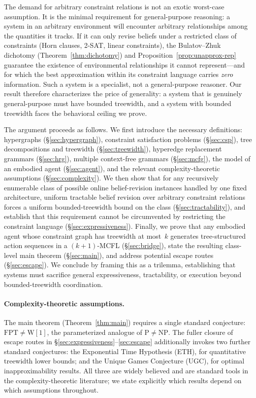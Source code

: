 \documentclass[11pt,a4paper]{article}
\theoremstyle{plain}
\theoremstyle{definition}
\theoremstyle{remark}
\begin{document}
The demand for arbitrary constraint relations is not an exotic worst-case assumption.
It is the minimal requirement for general-purpose reasoning: a system in an arbitrary environment will encounter arbitrary relationships among the quantities it tracks.
If it can only revise beliefs under a restricted class of constraints (Horn clauses, 2-SAT, linear constraints), the Bulatov--Zhuk dichotomy (Theorem~\ref{thm:dichotomy}) and Proposition~\ref{prop:unapprox-rep} guarantee the existence of environmental relationships it cannot represent---and for which the best approximation within its constraint language carries \emph{zero} information.
Such a system is a specialist, not a general-purpose reasoner.
Our result therefore characterizes the price of generality: a system that is genuinely general-purpose must have bounded treewidth, and a system with bounded treewidth faces the behavioral ceiling we prove.

The argument proceeds as follows.
We first introduce the necessary definitions: hypergraphs (\S\ref{sec:hypergraph}), constraint satisfaction problems (\S\ref{sec:csp}), tree decompositions and treewidth (\S\ref{sec:treewidth}), hyperedge replacement grammars (\S\ref{sec:hrg}), multiple context-free grammars (\S\ref{sec:mcfg}), the model of an embodied agent (\S\ref{sec:agent}), and the relevant complexity-theoretic assumptions (\S\ref{sec:complexity}).
We then show that for any recursively enumerable class of possible online belief-revision instances handled by one fixed architecture, uniform tractable belief revision over arbitrary constraint relations forces a uniform bounded-treewidth bound on the class (\S\ref{sec:tractability}), and establish that this requirement cannot be circumvented by restricting the constraint language (\S\ref{sec:expressiveness}).
Finally, we prove that any embodied agent whose constraint graph has treewidth at most~$k$ generates tree-structured action sequences in a $(k{+}1)$-MCFL (\S\ref{sec:bridge}), state the resulting class-level main theorem (\S\ref{sec:main}), and address potential escape routes (\S\ref{sec:escape}). We conclude by framing this as a trilemma, establishing that systems must sacrifice general expressiveness, tractability, or execution beyond bounded-treewidth coordination.

\paragraph{Complexity-theoretic assumptions.}
The main theorem (Theorem~\ref{thm:main}) requires a single standard conjecture: $\mathrm{FPT} \neq \mathrm{W}[1]$, the parameterized analogue of $\mathrm{P} \neq \mathrm{NP}$.
The fuller closure of escape routes in \S\ref{sec:expressiveness}--\ref{sec:escape} additionally invokes two further standard conjectures: the Exponential Time Hypothesis (ETH), for quantitative treewidth lower bounds; and the Unique Games Conjecture (UGC), for optimal inapproximability results.
All three are widely believed and are standard tools in the complexity-theoretic literature; we state explicitly which results depend on which assumptions throughout.
\end{document}
